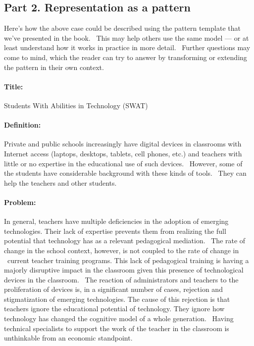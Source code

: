 \subsection{Part 2. Representation as a
pattern}\label{part-2.-representation-as-a-pattern}

Here's how the above case could be described using the pattern template
that we've presented in the book. ~This may help others use the same
model --- or at least understand how it works in practice in more
detail. ~Further questions may come to mind, which the reader can try to
answer by transforming or extending the pattern in their own context.

\paragraph{Title:}\label{title}

Students With Abilities in Technology (SWAT)

\paragraph{Definition:}\label{definition}

Private and public schools increasingly have digital devices in
classrooms with Internet access (laptops, desktops, tablets, cell
phones, etc.) and teachers with little or no expertise in the
educational use of such devices. ~However, some of the students have
considerable background with these kinds of tools.~ They can help the
teachers and other students.

\paragraph{Problem:}\label{problem}

In general, teachers have multiple deficiencies in the adoption of
emerging technologies. Their lack of expertise prevents them from
realizing the full potential that technology has as a relevant
pedagogical mediation. ~The rate of change in the school context,
however, is not coupled to the rate of change in ~current teacher
training programs. This lack of pedagogical training is having a majorly
disruptive impact in the classroom given this presence of technological
devices in the classroom. ~The reaction of administrators and teachers
to the proliferation of devices is, in a significant number of cases,
rejection and stigmatization of emerging technologies. The cause of this
rejection is that teachers ignore the educational potential of
technology. They ignore how technology has changed the cognitive model
of a whole generation. ~Having technical specialists to support the work
of the teacher in the classroom is unthinkable from an economic
standpoint.

